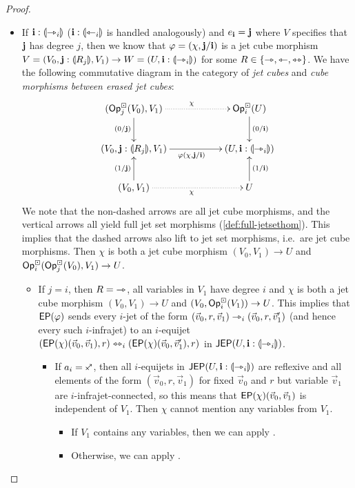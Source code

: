 \documentclass[a4paper]{article}
\begin{document}
\begin{proof}
\begin{itemize}
		\item If $\mathbf{i} : {\llparenthesis \rightarrowtriangle_i \rrparenthesis}$ ($\mathbf{i} : {\llparenthesis \leftarrowtriangle_i \rrparenthesis}$ is handled analogously) and $e_{\mathbf{i}} = \mathbf{j}$ where $V$ specifies that $\mathbf{j}$ has degree $j$, then we know that $\varphi = (\chi, \mathbf{j} / \mathbf{i})$ is a jet cube morphism $V = (V_0, \mathbf{j} : {\llparenthesis R_j \rrparenthesis}, V_1) \to W = (U, \mathbf{i} : {\llparenthesis \rightarrowtriangle_i \rrparenthesis})$ for some $R \in \mathopen{}\left\{ \rightarrowtriangle, \leftarrowtriangle, \leftrightarrowtriangle \right\}\mathclose{}$.
		We have the following commutative diagram in the category of \emph{jet cubes} and \emph{cube morphisms between erased jet cubes}:
		\[
			\xymatrix{
				(\Opcube_j(V_0), V_1)
					\ar[d]_{(0/\dm j)}
					\ar@{.>}[rr]^\chi
				&&
				\Opcube_i(U)
					\ar[d]^{(0/\dm i)}
				\\
				(V_0, \dm j : \rival{R_j}, V_1)
					\ar[rr]_{\vfi (\chi, \dm j / \dm i)}
				&& (U, \dm i : \rival{\jet_i})
				\\
				(V_0, V_1)
					\ar[u]^{(1/\dm j)}
					\ar@{.>}[rr]_\chi
				&&
				U
					\ar[u]_{(1/\dm i)}
			}
		\]
		We note that the non-dashed arrows are all jet cube morphisms, and the vertical arrows all yield full jet set morphisms (\cref{def:full-jetsethom}).
		This implies that the dashed arrows also lift to jet set morphisms, i.e.\ are jet cube morphisms.
		Then $\chi$ is both a jet cube morphism $(V_0, V_1) \to U$ and ${\mathsf{Op}}^\boxdot_i({\mathsf{Op}}^\boxdot_j(V_0), V_1) \to U$.
		\begin{itemize}
			\item If $j = i$, then $R = {\rightarrowtriangle}$, all variables in $V_1$ have degree $i$ and $\chi$ is both a jet cube morphism $(V_0, V_1) \to U$ and $(V_0, {\mathsf{Op}}^\boxdot_i(V_1)) \to U$.
			This implies that $\mathsf{EP}(\varphi)$ sends every $i$-jet of the form $(\vec v_0, r, \vec v_1) \rightarrowtriangle_i (\vec v_0, r, \vec v_1')$ (and hence every such $i$-infrajet) to an $i$-equijet $(\mathsf{EP}(\chi)(\vec v_0, \vec v_1), r) \leftrightarrowtriangle_i (\mathsf{EP}(\chi)(\vec v_0, \vec v'_1), r)$ in $\mathsf{JEP}(U, \mathbf{i} : {\llparenthesis \rightarrowtriangle_i \rrparenthesis})$.
			\begin{itemize}
				\item If $a_i = \ypolar$, then all $i$-equijets in $\mathsf{JEP}(U, \mathbf{i} : {\llparenthesis \rightarrowtriangle_i \rrparenthesis})$ are reflexive and all elements of the form $(\vec v_0, r, \vec v_1)$ for fixed $\vec v_0$ and $r$ but variable $\vec v_1$ are $i$-infrajet-connected, so this means that $\mathsf{EP}(\chi)(\vec v_0, \vec v_1)$ is independent of $V_1$.
				Then $\chi$ cannot mention any variables from $V_1$.
				\begin{itemize}
					\item If $V_1$ contains any variables, then we can apply .
					\item Otherwise, we can apply .
				\end{itemize}
				

\end{itemize}
\end{itemize}
\end{itemize}
\end{proof}
\end{document}
